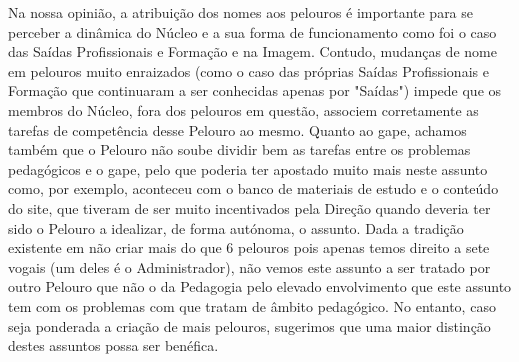 Na nossa opinião, a atribuição dos nomes aos pelouros é importante para se perceber a dinâmica do Núcleo e a sua forma de funcionamento como foi o caso das Saídas Profissionais e Formação e na Imagem. Contudo, mudanças de nome em pelouros muito enraizados (como o caso das próprias Saídas Profissionais e Formação que continuaram a ser conhecidas apenas por "Saídas") impede que os membros do Núcleo, fora dos pelouros em questão, associem corretamente as tarefas de competência desse Pelouro ao mesmo. Quanto ao \acrshort{gape}, achamos também que o Pelouro não soube dividir bem as tarefas entre os problemas pedagógicos e o \acrshort{gape}, pelo que poderia ter apostado muito mais neste assunto como, por exemplo, aconteceu com o banco de materiais de estudo e o conteúdo do site, que tiveram de ser muito incentivados pela Direção quando deveria ter sido o Pelouro a idealizar, de forma autónoma, o assunto. Dada a tradição existente em não criar mais do que 6 pelouros pois apenas temos direito a sete vogais (um deles é o Administrador), não vemos este assunto a ser tratado por outro Pelouro que não o da Pedagogia pelo elevado envolvimento que este assunto tem com os problemas com que tratam de âmbito pedagógico. No entanto, caso seja ponderada a criação de mais pelouros, sugerimos que uma maior distinção destes assuntos possa ser benéfica.